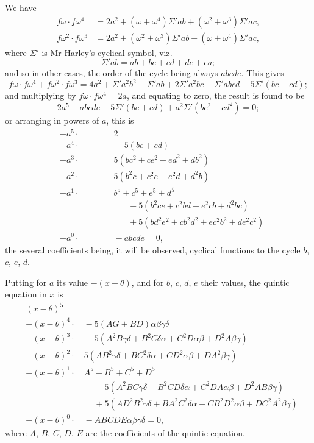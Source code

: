 \documentclass[11pt,a4paper]{article}
\theoremstyle{plain}
\begin{document}
We have
\begin{align*}
f\omega \cdot f\omega^4 &= 2a^2 + (\omega + \omega^4)\Sigma' ab + (\omega^2 + \omega^3)\Sigma' ac, \\
f\omega^2 \cdot f\omega^3 &= 2a^2 + (\omega^2 + \omega^3)\Sigma' ab + (\omega + \omega^4)\Sigma' ac,
\end{align*}
where $\Sigma'$ is Mr Harley's cyclical symbol, viz.
\[
\Sigma' ab = ab + bc + cd + de + ea;
\]
and so in other cases, the order of the cycle being always $abcde$. This gives
\[
f\omega \cdot f\omega^4 + f\omega^2 \cdot f\omega^3 = 4a^2 + \Sigma' a^2b^2 - \Sigma' ab + 2\Sigma' a^2bc - \Sigma' abcd - 5\Sigma' (bc + cd);
\]
and multiplying by $f\omega \cdot f\omega^4 = 2a$, and equating to zero, the result is found to be
\[
2a^5 - abcde - 5\Sigma' (bc + cd) + a^2\Sigma' (bc^2 + cd^2) = 0;
\]
or arranging in powers of $a$, this is
\begin{align*}
&+ a^5 \cdot \quad\quad\quad\quad 2 \\
&+ a^4 \cdot \quad\quad\quad\quad -5(be + cd) \\
&+ a^3 \cdot \quad\quad\quad\quad 5(bc^2 + ce^2 + ed^2 + db^2) \\
&+ a^2 \cdot \quad\quad\quad\quad 5(b^2c + c^2e + e^2d + d^2b) \\
&+ a^1 \cdot \quad\quad\quad\quad b^5 + c^5 + e^5 + d^5 \\
&\quad\quad\quad\quad\quad\quad\quad\quad - 5(b^2ce + c^2bd + e^2cb + d^2bc) \\
&\quad\quad\quad\quad\quad\quad\quad\quad + 5(bd^2e^2 + cb^2d^2 + ec^2b^2 + de^2c^2) \\
&+ a^0 \cdot \quad\quad\quad\quad -abcde = 0,
\end{align*}
the several coefficients being, it will be observed, cyclical functions to the cycle $b$, $c$, $e$, $d$.

\newpage
Putting for $a$ its value $-(x-\theta)$, and for $b$, $c$, $d$, $e$ their values, the quintic equation in $x$ is
\begin{align*}
&(x-\theta)^5 \\
&+ (x-\theta)^4 \cdot \quad -5(AG + BD)\alpha\beta\gamma\delta \\
&+ (x-\theta)^3 \cdot \quad -5(A^2B\gamma\delta + B^2C\delta\alpha + C^2D\alpha\beta + D^2A\beta\gamma) \\
&+ (x-\theta)^2 \cdot \quad 5(AB^2\gamma\delta + BC^2\delta\alpha + CD^2\alpha\beta + DA^2\beta\gamma) \\
&+ (x-\theta)^1 \cdot \quad A^5 + B^5 + C^5 + D^5 \\
&\quad\quad\quad\quad\quad\quad\quad\quad - 5(A^2BC\gamma\delta + B^2CD\delta\alpha + C^2DA\alpha\beta + D^2AB\beta\gamma) \\
&\quad\quad\quad\quad\quad\quad\quad\quad + 5(AD^2B^2\gamma\delta + BA^2C^2\delta\alpha + CB^2D^2\alpha\beta + DC^2A^2\beta\gamma) \\
&+ (x-\theta)^0 \cdot \quad -ABCDE\alpha\beta\gamma\delta = 0,
\end{align*}
where $A$, $B$, $C$, $D$, $E$ are the coefficients of the quintic equation.
\end{document}
